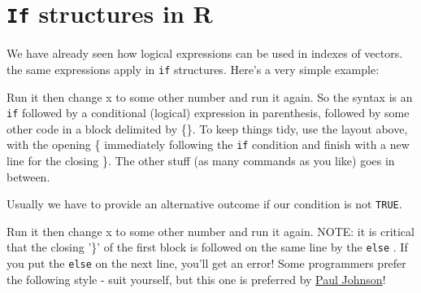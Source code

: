 \documentclass[titlepage]{book}\usepackage{knitr}
\begin{document}
\section{\texttt{If} structures in R}
We have already seen how logical expressions can be used in indexes of vectors.  the same expressions apply in
\texttt{if} structures. Here's a very simple example:
\begin{knitrout}
\color{fgcolor}\begin{kframe}
\begin{alltt}
 \hlkwb{<-} 
  \hlopt{==} \hlstd{)\{}
\hlstd{\}}
\end{alltt}
\end{kframe}
\end{knitrout}
Run it then change x to some other number and run it again.
So the syntax is an \texttt{if} followed by a conditional (logical) expression in parenthesis, followed by some other code in a block delimited by \{\}.  To keep things tidy, use the layout above, with the opening \{ immediately following the \texttt{if} condition and finish with a new line for the closing \}. The other stuff (as many commands as you like) goes in between.

Usually we have to provide an alternative outcome if our condition is not \texttt{TRUE}.
\begin{knitrout}
\color{fgcolor}\begin{kframe}
\begin{alltt}
 \hlkwb{<-} 
  \hlopt{==} \hlstd{)}
  \hlstd{\{}
    \hlstd{(}\hlstd{)}
  \hlstd{\}} 
  \hlstd{\{}
  \hlstd{\}}
\end{alltt}
\end{kframe}
\end{knitrout}
Run it then change x to some other number and run it again.
NOTE: it is critical that the closing '\}' of the first block is followed on the same line by the \texttt{else} . If you put the \texttt{else} on the next line, you'll get an error! Some programmers prefer the following style - suit yourself, but this one is preferred by \href{http://cran.r-project.org/web/packages/rockchalk/vignettes/Rstyle.pdf}{ Paul Johnson}!
\begin{knitrout}
\color{fgcolor}\begin{kframe}
\begin{alltt}
 \hlkwb{<-} 
  \hlopt{==} \hlstd{) \{}
  \hlstd{(}\hlstd{)}
\hlstd{\}}  \hlstd{\{}
\hlstd{\}}
\end{alltt}
\end{kframe}
\end{knitrout}
\end{document}
